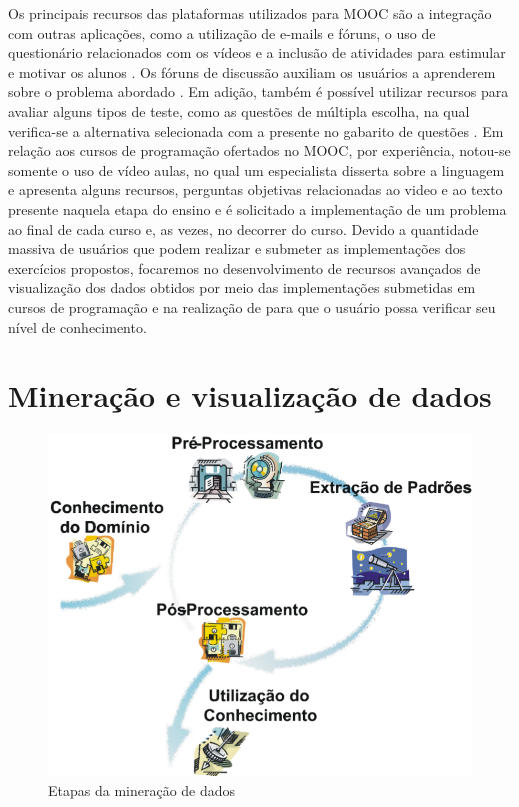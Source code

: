 		Os principais recursos das plataformas utilizados para \acs{MOOC} são a integração
		com outras aplicações, como a utilização de e-mails e fóruns, o uso de questionário
		relacionados com os vídeos e a inclusão de atividades para estimular e motivar
		os alunos \cite{fassbinder2014}. Os fóruns de discussão auxiliam os usuários
		a aprenderem sobre o problema abordado \cite{schmidt2013producing}.
		Em adição, também é possível utilizar recursos para avaliar alguns tipos de
		teste, como as questões de múltipla escolha, na qual verifica-se a alternativa
		selecionada com a presente no gabarito de questões \cite{alario2013analysing}.
		Em relação aos cursos de programação ofertados no \acs{MOOC}, por experiência,
		notou-se somente o uso de vídeo aulas, no qual um especialista disserta sobre
		a linguagem e apresenta alguns recursos, perguntas objetivas relacionadas ao
		video e ao texto presente naquela etapa do ensino e é solicitado a implementação
		de um problema ao final de cada curso e, as vezes, no decorrer do curso.
		Devido a quantidade massiva de usuários que podem realizar e submeter as
		implementações dos exercícios propostos, focaremos no desenvolvimento de
		recursos avançados de visualização dos dados obtidos por meio das implementações
		submetidas em cursos de programação e na realização de  para
		que o usuário possa verificar seu nível de conhecimento.

	\section{Mineração e visualização de dados}
	\label{sec:FundTeor}
		
		\begin{figure}[b]
			\centering
			\includegraphics[width=0.6\linewidth]{imagem/mineracaoDados}
			\caption[Etapas da mineração de dados]{Etapas da mineração de dados \cite{rezende2003}}
			\label{fig:mineracaoDados}
		\end{figure}
		
